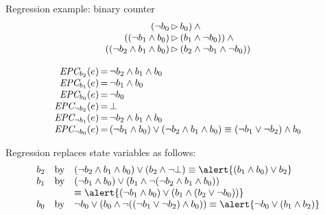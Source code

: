 \documentclass{gkibeamer}
\begin{document}
\begin{frame}{Regression example: binary counter}
  \[
    \begin{array}{r@{\,}c@{\,}l}
      (\neg b_0 & \CEF & b_0) \land{} \\
      ((\neg b_1 \land b_0) & \CEF & (b_1 \land \neg b_0)) \land{} \\
      ((\neg b_2 \land b_1 \land b_0) & \CEF & (b_2 \land \neg b_1
      \land \neg b_0))
    \end{array}
  \]

  \begin{small}
    \[
      \begin{array}{r@{\,}c@{\,}l}
        \eprecon{b_2}{e} & = & \neg b_2 \land b_1 \land b_0 \\
        \eprecon{b_1}{e} & = & \neg b_1 \land b_0 \\
        \eprecon{b_0}{e} & = & \neg b_0 \\
        \eprecon{\neg b_2}{e} & = & \bot \\
        \eprecon{\neg b_1}{e} & = & \neg b_2 \land b_1 \land b_0 \\
        \eprecon{\neg b_0}{e} & = &
        (\neg b_1 \land b_0) \lor (\neg b_2 \land b_1 \land b_0)
        \equiv (\neg b_1 \lor \neg b_2) \land b_0
      \end{array}
    \]
  \end{small}
  Regression replaces state variables as follows:
  \[
    \begin{array}{rcl}
      b_2 & \text{by} &
      (\neg b_2 \land b_1 \land b_0) \lor (b_2 \land \neg \bot)
      \equiv \alert{(b_1 \land b_0) \lor b_2} \\
      b_1 & \text{by} &
      (\neg b_1 \land b_0)
      \lor
      (b_1 \land \neg (\neg b_2 \land b_1 \land b_0)) \\
      && \equiv \alert{
        (\neg b_1 \land b_0)
        \lor
        (b_1 \land(b_2 \lor \neg b_0))} \\
      b_0 & \text{by} &
      \neg b_0
      \lor
      (b_0 \land \neg ((\neg b_1 \lor \neg b_2) \land b_0))
      \equiv \alert{\neg b_0 \lor (b_1 \land b_2)}
    \end{array}
    \]
\end{frame}
\end{document}
